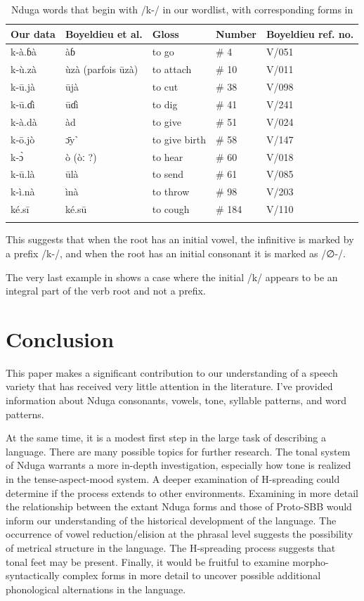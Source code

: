 \documentclass[output=paper,colorlinks,citecolor=brown
]{langscibook}
\begin{document}
\begin{table}
\caption{Nduga words that begin with /k-/ in our wordlist, with corresponding forms in \citet{boyeldieuetal2006}}
\label{tab:olson:initialk}
 \begin{tabular}{lllll}
  \lsptoprule
 Our data & Boyeldieu et al. & Gloss & Number & Boyeldieu ref. no. \\
  \midrule
 k-à.ɓà & àɓ & to go & \# 4 & V/051 \\
 k-ù.zà & ùzà (parfois ūzà) & to attach & \# 10 & V/011 \\
 k-ū.jà & ūjà & to cut & \# 38 & V/098 \\
 k-ū.ɗì & ūɗì & to dig & \# 41 & V/241 \\
 k-à.dà & àd & to give & \# 51 & V/024 \\
 k-ō.jò & ɔ̄yˋ & to give birth & \# 58 & V/147 \\
 k-ɔ̀ & ò (òː ?) & to hear & \# 60 & V/018 \\
 k-ū.là & ūlà & to send & \# 61 & V/085 \\
 k-ì.nà & ìnà & to throw & \# 98 & V/203 \\
 ké.sī & ké.sū & to cough & \# 184 & V/110 \\
  \lspbottomrule
 \end{tabular}
\end{table}

This suggests that when the root has an initial vowel, the infinitive is marked by a prefix /k-/, and when the root has an initial consonant it is marked as /∅-/.

The very last example in  shows a case where the initial /k/ appears to be an integral part of the verb root and not a prefix.

\section{Conclusion}
\label{sec:olson:conclusion}

This paper makes a significant contribution to our understanding of a speech variety that has received very little attention in the literature. I’ve provided information about Nduga consonants, vowels, tone, syllable patterns, and word patterns.

At the same time, it is a modest first step in the large task of describing a language. There are many possible topics for further research. The tonal system of Nduga warrants a more in-depth investigation, especially how tone is realized in the tense-aspect-mood system. A deeper examination of H-spreading could determine if the process extends to other environments. Examining in more detail the relationship between the extant Nduga forms and those of Proto-SBB would inform our understanding of the historical development of the language. The occurrence of vowel reduction/elision at the phrasal level suggests the possibility of metrical structure in the language. The H-spreading process suggests that tonal feet may be present. Finally, it would be fruitful to examine morpho-syntactically complex forms in more detail to uncover possible additional phonological alternations in the language.
\end{document}

